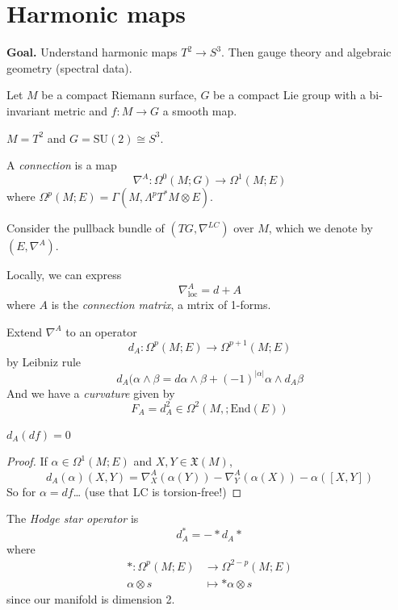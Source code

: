\documentclass{book}
\begin{document}
\section{Harmonic maps}
\label{section-harmonic-maps}

{\bf Goal.} Understand harmonic maps $T^2 \to
S^3$. Then gauge theory and
algebraic geometry (spectral data).

Let $M$ be a compact Riemann surface, $G$ be
a compact Lie group with a
bi-invariant metric and $f:M\to G$ a smooth
map.

\begin{example}
\label{example-torus}
$M=T^2$ and $G=\text{SU}(2)\cong S^3$.
\end{example}

\begin{definition}
\label{definition-connection}
A {\it connection} is a map
$$
\nabla^A:\Omega^{0}(M;G)\to \Omega^{1}(M;E)
$$
where
$\Omega^{p}(M;E)=\Gamma(M,\Lambda^{p}
T^*M\otimes
E)$.
\end{definition}

Consider the pullback bundle of
$(TG,\nabla^{LC})$ over $M$, which we denote
by
$(E,\nabla^A)$.

Locally, we can express
$$
\nabla^A_{\text{loc}}=d+A
$$
where $A$ is the {\it connection matrix}, a
mtrix of 1-forms.

Extend  $\nabla^A$ to an operator
$$
d_A:\Omega^{p}(M;E)\to \Omega^{p+1}(M;E)
$$
by Leibniz rule
$$
d_A(\alpha\wedge\beta=d\alpha\wedge\beta+(-1)
^{|\alpha|}\alpha\wedge
d_A\beta
$$
And we have a {\it curvature} given by
$$
F_A=d^2_A\in\Omega^{2}(M,;\text{End}(E))
$$

\begin{lemma}
\label{lemma-derivative-of-differential}
$d_A(df)=0$
\end{lemma}

\begin{proof}
If $\alpha\in\Omega^{1}(M;E)$ and
$X,Y\in\mathfrak{X}(M)$,
$$
d_A(\alpha)(X,Y)=\nabla_X^A(\alpha(Y))-
\nabla_Y^A(\alpha(X))-\alpha([X,Y])
$$
So for $\alpha=df$… (use that LC is
torsion-free!)
\end{proof}

\begin{definition}
\label{definition-Hodge-star}
The {\it Hodge star operator} is
$$
d^*_A=-*d_A*
$$
where
$$
\begin{aligned}
*: \Omega^{p}(M;E) &\longrightarrow
\Omega^{2-p}(M;E) \\
\alpha\otimes s &\longmapsto *\alpha\otimes s
\end{aligned}
$$
since our manifold is dimension 2.
\end{definition}
\end{document}
